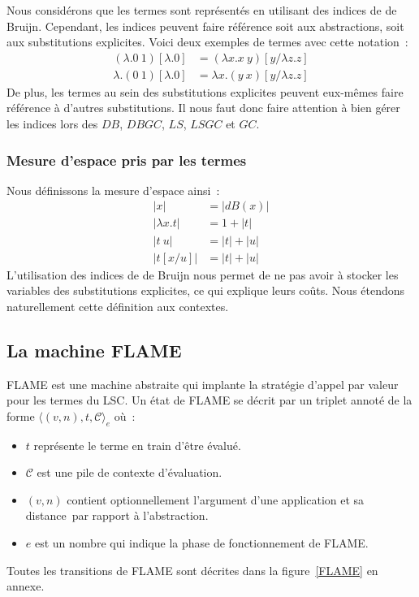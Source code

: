 \documentclass[a4paper, 11pt]{article}
\theoremstyle{definition}
\newcommand{\etat}[1]{\langle #1 \rangle}
\newcommand{\mcc}{\mathcal{C}}
\begin{document}
Nous considérons que les termes sont représentés en utilisant des indices de de Bruijn. 
Cependant, les indices peuvent faire référence soit aux abstractions, soit aux substitutions explicites. 
Voici deux exemples de termes avec cette notation~:
\begin{align*}
    (\lambda.0~1)[\lambda.0] &= (\lambda x.x~y)[y/\lambda z.z]\\
    \lambda.(0~1)[\lambda.0] &=\lambda x.(y~x)[y/\lambda z.z]
\end{align*}
De plus, les termes au sein des substitutions explicites peuvent eux-mêmes faire référence à d'autres substitutions. 
Il nous faut donc faire attention à bien gérer les indices lors des $DB$, $DBGC$, $LS$, $LSGC$ et $GC$. 
\subsubsection{Mesure d'espace pris par les termes}
Nous définissons la mesure d'espace ainsi~:
\begin{align*}
    |x| &= |dB(x)|\\
    |\lambda x.t| &= 1 + |t|\\
    |t~u| &= |t|+|u|\\
    |t[x/u]| &= |t|+|u|
\end{align*}
L'utilisation des indices de de Bruijn nous permet de ne pas avoir à stocker les variables des substitutions explicites, ce qui explique leurs coûts. 
Nous étendons naturellement cette définition aux contextes.
\subsection{La machine FLAME}
\label{def:flame}
FLAME est une machine abstraite qui implante la stratégie d'appel par valeur pour les termes du LSC. 
Un état de FLAME se décrit par un triplet annoté de la forme $\etat{(v,n),t,\mcc}_e$ où~:
\begin{itemize}
  \item $t$ représente le terme en train d'être évalué.
  \item $\mcc$ est une pile de contexte d'évaluation.
    \item $(v, n)$ contient optionnellement l'argument d'une application et sa \og distance\fg~par rapport à l'abstraction.
    \item $e$ est un nombre qui indique la phase de fonctionnement de FLAME.
    \end{itemize} 
Toutes les transitions de FLAME sont décrites dans la figure~\ref{FLAME} en annexe.
\end{document}
